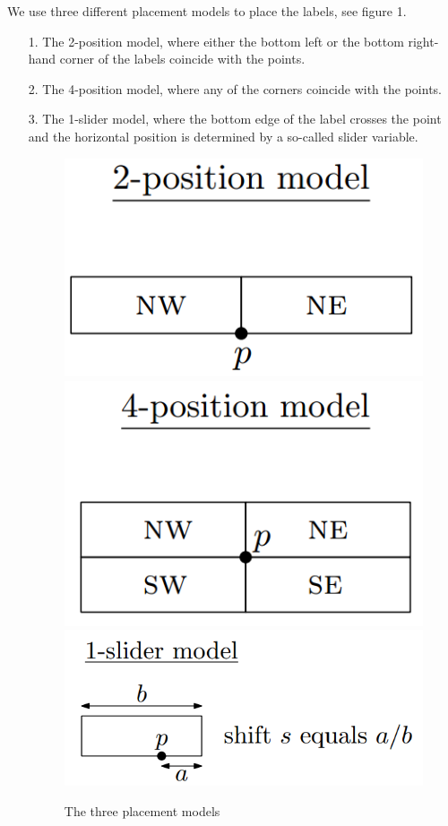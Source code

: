 \documentclass[crop=false,a4paper,oneside,11pt]{standalone}
\begin{document}
 We use three different placement models to place the labels, see figure 1.
 \begin{enumerate}
 \item[1.] The 2-position model, where either the bottom left or the bottom right-hand corner of the labels coincide with the points.
 \item[2.] The 4-position model, where any of the corners coincide with the points.
 \item[3.] The 1-slider model, where the bottom edge of the label crosses the point and the horizontal position is determined by a so-called slider variable.
 \begin{figure}[h!]
 \includegraphics[scale = 0.5]{2pos.png} \includegraphics[scale = 0.5]{4pos.png} \includegraphics[scale = 0.5]{1slider.png}\\
 \caption{The three placement models}
 \end{figure}
 \end{enumerate}
\end{document}
